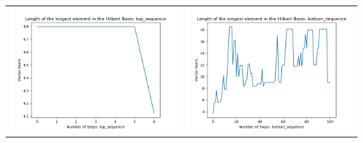 \documentclass[10pt]{article}
\begin{document}
\begin{tabular}{c|c}
\begin{minipage}{.4\textwidth}
\includegraphics[width=\textwidth]{"DATA/5d/5 generators 2 bound B/top_sequence LENGTH"}
\end{minipage} &
\begin{minipage}{.4\textwidth}
\includegraphics[width=\textwidth]{"DATA/5d/5 generators 2 bound B bottomup/bottom_sequence LENGTH"}
\end{minipage}
\end{tabular}
\end{document}
